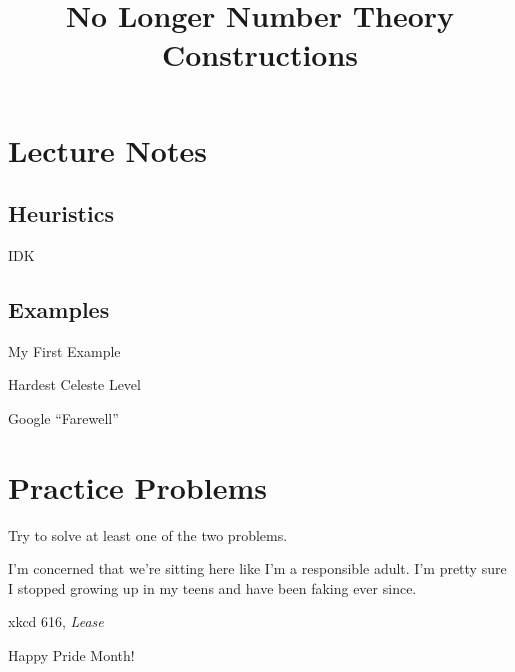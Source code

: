 \documentclass[11pt]{scrartcl}
\begin{document}
\title{No Longer Number Theory Constructions}
\maketitle


\section{Lecture Notes}
\subsection{Heuristics}

IDK

\subsection{Examples}

\begin{example}[Example]
    My First Example
\end{example}

\begin{example}[Walkthrough]
    Hardest Celeste Level
\end{example}

\begin{walkthrough}
    Google ``Farewell''
\end{walkthrough}


\pagebreak


\section{Practice Problems}

Try to solve at least one of the two  problems.

\epigraph{I'm concerned that we're sitting here
like I'm a responsible adult.
I'm pretty sure I stopped growing up in my teens
and have been faking ever since.}
{xkcd 616, \emph{Lease}}

\begin{probZR}
    Happy Pride Month!
\end{probZR}


\conclusion
\end{document}
